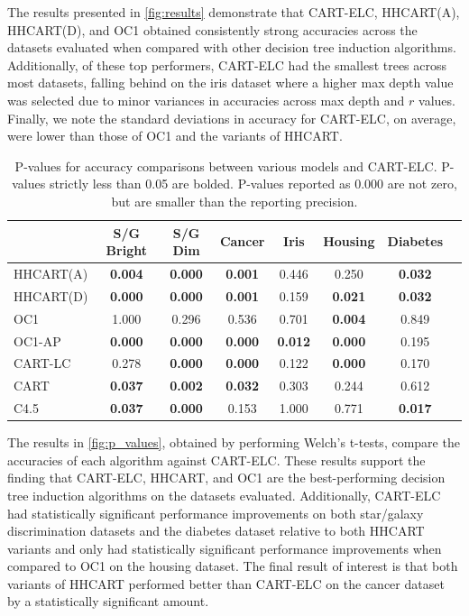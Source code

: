 \documentclass[10pt]{article} %
\begin{document}
The results presented in \autoref{fig:results} demonstrate that CART-ELC, HHCART(A), HHCART(D), and OC1 obtained consistently strong accuracies across the datasets evaluated when compared with other decision tree induction algorithms. Additionally, of these top performers, CART-ELC had the smallest trees across most datasets, falling behind on the iris dataset where a higher max depth value was selected due to minor variances in accuracies across max depth and $r$ values. Finally, we note the standard deviations in accuracy for CART-ELC, on average, were lower than those of OC1 and the variants of HHCART.


\begin{table}[h]
	\centering
\caption{P-values for accuracy comparisons between various models and CART-ELC. P-values strictly less than 0.05 are bolded. P-values reported as 0.000 are not zero, but are smaller than the reporting precision.}
	\small
	\begin{tabular}{lccccccc} 
		\addlinespace
		\toprule
		\multirow{1}{*}{Algorithm} & \multirow{1}{*}{S/G Bright} & \multirow{1}{*}{S/G Dim} & \multirow{1}{*}{Cancer} & \multirow{1}{*}{Iris} & \multirow{1}{*}{Housing} & \multirow{1}{*}{Diabetes} \\ 
		\midrule
HHCART(A) & \textbf{0.004} & \textbf{0.000} & \textbf{0.001} & 0.446 & 0.250 & \textbf{0.032} \\
HHCART(D) & \textbf{0.000} & \textbf{0.000} & \textbf{0.001} & 0.159 & \textbf{0.021} & \textbf{0.032} \\
OC1 & 1.000 & 0.296 & 0.536 & 0.701 & \textbf{0.004} & 0.849 \\
OC1-AP & \textbf{0.000} & \textbf{0.000} & \textbf{0.000} & \textbf{0.012} & \textbf{0.000} & 0.195 \\
CART-LC & 0.278 & \textbf{0.000} & \textbf{0.000} & 0.122 & \textbf{0.000} & 0.170 \\
CART & \textbf{0.037} & \textbf{0.002} & \textbf{0.032} & 0.303 & 0.244 & 0.612 \\
C4.5 & \textbf{0.037} & \textbf{0.000} & 0.153 & 1.000 & 0.771 & \textbf{0.017} \\
    \bottomrule
\end{tabular}
\label{fig:p_values}
\end{table}

The results in \autoref{fig:p_values}, obtained by performing Welch's t-tests, compare the accuracies of each algorithm against CART-ELC. These results support the finding that CART-ELC, HHCART, and OC1 are the best-performing decision tree induction algorithms on the datasets evaluated. Additionally, CART-ELC had statistically significant performance improvements on both star/galaxy discrimination datasets and the diabetes dataset relative to both HHCART variants and only had statistically significant performance improvements when compared to OC1 on the housing dataset. The final result of interest is that both variants of HHCART performed better than CART-ELC on the cancer dataset by a statistically significant amount.
\end{document}
